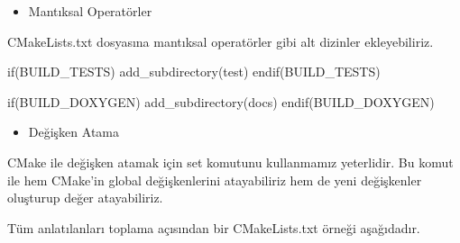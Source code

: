 \documentclass[
]{book}
\newenvironment{Shaded}{\begin{snugshade}}{\end{snugshade}}
\newcommand{\ExtensionTok}[1]{#1}
\newcommand{\KeywordTok}[1]{\textcolor[rgb]{0.13,0.29,0.53}{\textbf{#1}}}
\newcommand{\NormalTok}[1]{#1}
\newcommand{\OperatorTok}[1]{\textcolor[rgb]{0.81,0.36,0.00}{\textbf{#1}}}
\newcommand{\VariableTok}[1]{\textcolor[rgb]{0.00,0.00,0.00}{#1}}
\providecommand{\tightlist}{%
  \setlength{\itemsep}{0pt}\setlength{\parskip}{0pt}}
\begin{document}
\begin{itemize}
\tightlist
\item
  Mantıksal Operatörler
\end{itemize}

CMakeLists.txt dosyasına mantıksal operatörler gibi alt dizinler ekleyebiliriz.

\begin{Shaded}
\begin{Highlighting}[]
  \ExtensionTok{if}\NormalTok{(BUILD\_TESTS)}
    \ExtensionTok{add\_subdirectory}\NormalTok{(test)}
  \ExtensionTok{endif}\NormalTok{(BUILD\_TESTS)}

  \ExtensionTok{if}\NormalTok{(BUILD\_DOXYGEN)}
    \ExtensionTok{add\_subdirectory}\NormalTok{(docs)}
  \ExtensionTok{endif}\NormalTok{(BUILD\_DOXYGEN)}
\end{Highlighting}
\end{Shaded}

\begin{itemize}
\tightlist
\item
  Değişken Atama
\end{itemize}

CMake ile değişken atamak için set komutunu kullanmamız yeterlidir. Bu komut ile hem CMake'in global değişkenlerini atayabiliriz hem de yeni değişkenler oluşturup değer atayabiliriz.

\begin{Shaded}
\end{Shaded}

Tüm anlatılanları toplama açısından bir CMakeLists.txt örneği aşağıdadır.
\end{document}
